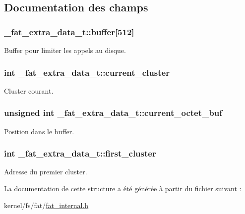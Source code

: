 \subsection{Documentation des champs}
\hypertarget{struct__fat__extra__data__t_a74dd347d769bd4aefdf0ad1207be6798}{
\subsubsection[{buffer}]{ \+\_\+fat\+\_\+extra\+\_\+data\+\_\+t\+::buffer\mbox{[}512\mbox{]}}}\label{struct__fat__extra__data__t_a74dd347d769bd4aefdf0ad1207be6798}
Buffer pour limiter les appels au disque. \hypertarget{struct__fat__extra__data__t_a0708cae473b2962cfa6c10f50d9b008b}{
\subsubsection[{current\+\_\+cluster}]{\setlength{\rightskip}{0pt plus 5cm}int \+\_\+fat\+\_\+extra\+\_\+data\+\_\+t\+::current\+\_\+cluster}}\label{struct__fat__extra__data__t_a0708cae473b2962cfa6c10f50d9b008b}
Cluster courant. \hypertarget{struct__fat__extra__data__t_a38be57e802b36532ce01e46d7be7da44}{
\subsubsection[{current\+\_\+octet\+\_\+buf}]{\setlength{\rightskip}{0pt plus 5cm}unsigned int \+\_\+fat\+\_\+extra\+\_\+data\+\_\+t\+::current\+\_\+octet\+\_\+buf}}\label{struct__fat__extra__data__t_a38be57e802b36532ce01e46d7be7da44}
Position dans le buffer. \hypertarget{struct__fat__extra__data__t_a5cc9910b0f971c600d2d4a52290509fa}{
\subsubsection[{first\+\_\+cluster}]{\setlength{\rightskip}{0pt plus 5cm}int \+\_\+fat\+\_\+extra\+\_\+data\+\_\+t\+::first\+\_\+cluster}}\label{struct__fat__extra__data__t_a5cc9910b0f971c600d2d4a52290509fa}
Adresse du premier cluster. 

La documentation de cette structure a été générée à partir du fichier suivant \+:\begin{DoxyCompactItemize}
\item 
kernel/fs/fat/\hyperlink{fat__internal_8h}{fat\+\_\+internal.\+h}\end{DoxyCompactItemize}
